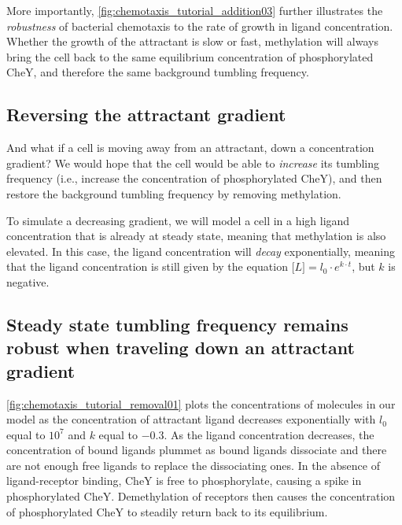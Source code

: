 More importantly, \autoref{fig:chemotaxis_tutorial_addition03} further illustrates the \textit{robustness} of bacterial chemotaxis to the rate of growth in ligand concentration. Whether the growth of the attractant is slow or fast, methylation will always bring the cell back to the same equilibrium concentration of phosphorylated CheY, and therefore the same background tumbling frequency.

\FloatBarrier
{}
\subsection{Reversing the attractant gradient}

And what if a cell is moving away from an attractant, down a concentration gradient? We would hope that the cell would be able to \textit{increase} its tumbling frequency (i.e., increase the concentration of phosphorylated CheY), and then restore the background tumbling frequency by removing methylation.

To simulate a decreasing gradient, we will model a cell in a high ligand concentration that is already at steady state, meaning that methylation is also elevated. In this case, the ligand concentration will \textit{decay} exponentially, meaning that the ligand concentration is still given by the equation $\text{[}L{]} = l_0 \cdot e^{k \cdot t}$, but $k$ is negative.\\

\begin{qbox}\end{qbox}


\FloatBarrier
{}
\subsection{Steady state tumbling frequency remains robust when traveling down an attractant gradient}

\autoref{fig:chemotaxis_tutorial_removal01} plots the concentrations of molecules in our model as the concentration of attractant ligand decreases exponentially with $l_0$ equal to $10^7$ and $k$ equal to $-0.3$. As the ligand concentration decreases, the concentration of bound ligands plummet as bound ligands dissociate and there are not enough free ligands to replace the dissociating ones. In the absence of ligand-receptor binding, CheY is free to phosphorylate, causing a spike in phosphorylated CheY. Demethylation of receptors then causes the concentration of phosphorylated CheY to steadily return back to its equilibrium.\\

